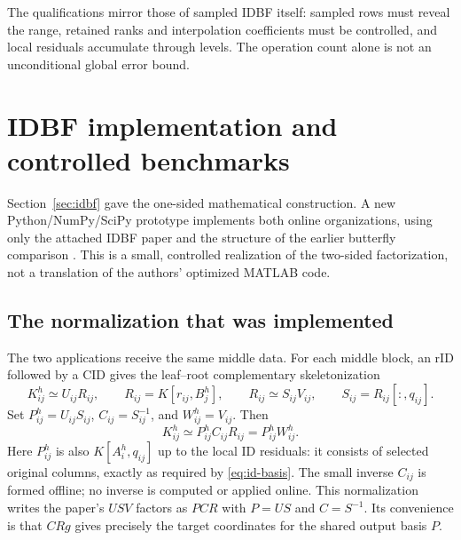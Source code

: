\documentclass[11pt]{article}
\begin{document}
The qualifications mirror those of sampled IDBF itself: sampled rows must reveal the range, retained ranks and interpolation coefficients must be controlled, and local residuals accumulate through levels.  The operation count alone is not an unconditional global error bound.

\section{IDBF implementation and controlled benchmarks}
\label{sec:idbfbench}

Section~\ref{sec:idbf} gave the one-sided mathematical construction.  A new Python/NumPy/SciPy prototype implements both online organizations, using only the attached IDBF paper and the structure of the earlier butterfly comparison \cite{IDBF,IDBFCode}.  This is a small, controlled realization of the two-sided factorization, not a translation of the authors' optimized MATLAB code.

\subsection{The normalization that was implemented}
\label{sec:idbf-normalization}

The two applications receive the same middle data.  For each middle block, an rID followed by a CID gives the leaf--root complementary skeletonization
\[
 K_{ij}^{h}\simeq U_{ij}R_{ij},\qquad
 R_{ij}=K[r_{ij},B_j^h],\qquad
 R_{ij}\simeq S_{ij}V_{ij},\qquad
 S_{ij}=R_{ij}[:,q_{ij}].
\]
Set $P_{ij}^{h}=U_{ij}S_{ij}$, $C_{ij}=S_{ij}^{-1}$, and $W_{ij}^{h}=V_{ij}$.  Then
\[
 K_{ij}^{h}\simeq P_{ij}^{h}C_{ij}R_{ij}
 =P_{ij}^{h}W_{ij}^{h}.
 \tag{23}\label{eq:id-normalized-seed}
\]
Here $P_{ij}^{h}$ is also $K[A_i^h,q_{ij}]$ up to the local ID residuals: it consists of selected original columns, exactly as required by \eqref{eq:id-basis}.  The small inverse $C_{ij}$ is formed offline; no inverse is computed or applied online.  This normalization writes the paper's $U S V$ factors as $P C R$ with $P=US$ and $C=S^{-1}$.  Its convenience is that $C Rg$ gives precisely the target coordinates for the shared output basis $P$.
\end{document}
